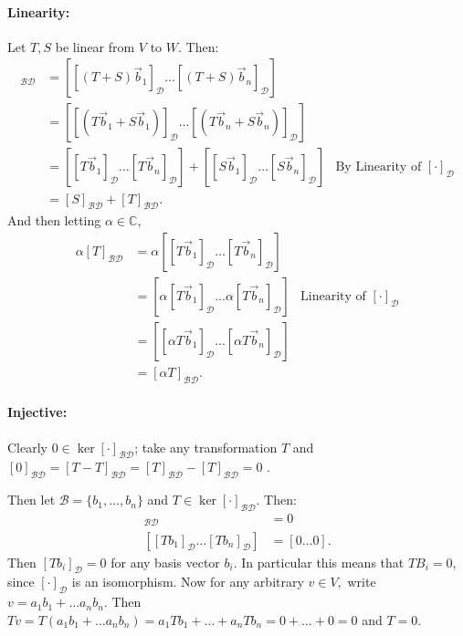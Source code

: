 \documentclass{article}
\begin{document}
\begin{enumerate}
\begin{enumerate}
          \paragraph{Linearity: }Let $T,S$ be linear from $V$ to $W$. Then:
          \begin{align*}
              [T+S]_{\mathcal{B}\mathcal{D}}&= \left[ [(T+S)\vec{b}_1]_\mathcal{D} \ldots [(T+S)\vec{b}_n]_\mathcal{D}  \right] \\
               &= \left[ [(T\vec{b}_1+S\vec{b}_1)]_\mathcal{D} \ldots [(T\vec{b}_n+S\vec{b}_n)]_\mathcal{D}  \right]\\
               &= \left[ [T\vec{b}_1]_\mathcal{D}\ldots [T\vec{b}_n]_\mathcal{D} \right] + \left[ [S\vec{b}_1]_\mathcal{D}\ldots [S\vec{b}_n]_\mathcal{D} \right] &\text{By Linearity of }[\cdot]_\mathcal{D}\\
               &=  [S]_{\mathcal{B}\mathcal{D}} +[T]_{\mathcal{B}\mathcal{D}} 
          .\end{align*}
          And then letting $\alpha\in \mathbb{C}$,
           \begin{align*}
               \alpha[T]_{\mathcal{B}\mathcal{D}}&=\alpha\left[ [T\vec{b}_1]_\mathcal{D}\ldots[T\vec{b}_n]_\mathcal{D} \right] \\
                         &=\left[ \alpha[T\vec{b}_1]_\mathcal{D} \ldots\alpha[T\vec{b}_n]_\mathcal{D}  \right]&\text{Linearity of }[\cdot]_\mathcal{D}\\
                         &=\left[ [\alpha T\vec{b}_1]_\mathcal{D} \ldots[\alpha T\vec{b}_n]_\mathcal{D} \right] \\
               &= [\alpha T]_{\mathcal{B}\mathcal{D}} 
          .\end{align*}
          \paragraph{Injective: } 
          Clearly  $0\in \ker[\cdot ]_{\mathcal{BD}}$; take any transformation $T$ and $[0]_{\mathcal{BD}}=[T-T]_{\mathcal{BD}}=[T]_{\mathcal{BD}}-[T]_{\mathcal{BD}}=0$ .

      Then let $\mathcal{B}=\{b_1,\ldots ,b_n\} $ and $T\in \ker [\cdot ]_\mathcal{BD} $. Then:
      \begin{align*}
          [T]_{\mathcal{BD}}&=0\\
          \left[ [Tb_1]_\mathcal{D}\ldots [Tb_n]_\mathcal{D}\right] &=[0\ldots 0]
      .\end{align*} 
      Then $[Tb_i]_{\mathcal{D}}=0$ for any basis vector $b_i$. In particular this means that $TB_i=0$, since $[\cdot ]_\mathcal{D}$ is an isomorphism. Now for any arbitrary $v\in V,$ write $v=a_1b_1+\ldots a_nb_n$. Then $Tv=T(a_1b_1+\ldots a_n b_n)=a_1Tb_1+\ldots+a_nTb_n=0+\ldots+0=0$ and $T=0$.


\end{enumerate}
\end{enumerate}
\end{document}
